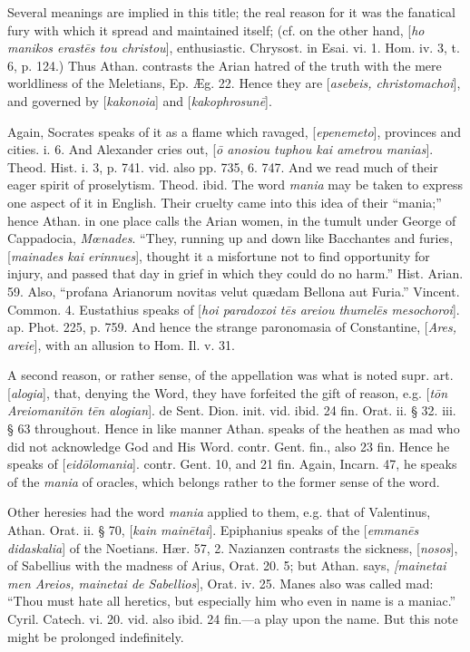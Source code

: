 Several meanings are implied in this title; the
real reason for it was the fanatical fury with which it spread
and maintained itself; (cf. on the other hand, [\emph{ho manikos erast\={e}s
tou christou}], enthusiastic. Chrysost. in Esai. vi. 1. Hom. iv. 3,
t. 6, p. 124.) Thus Athan. contrasts the Arian hatred of the truth
with the mere worldliness of the Meletians, Ep. Æg. 22. Hence they
are [\emph{asebeis, christomachoi}], and governed by [\emph{kakonoia}]
and [\emph{kakophrosun\={e}}].

Again, Socrates speaks of it as a flame which
ravaged, [\emph{epenemeto}], provinces and cities. i. 6. And Alexander
cries out, [\emph{\={o} anosiou tuphou kai ametrou manias}]. Theod.
Hist. i. 3, p. 741. vid. also pp. 735, 6. 747. And we read much of
their eager spirit of proselytism. Theod. ibid. The word \emph{mania}
may be taken to express one aspect of it in English. Their cruelty
came into this idea of their “mania;” hence Athan. in one place
calls the Arian women, in the tumult under George of Cappadocia, \emph{Mœnades}.
“They, running up and down like Bacchantes and furies, [\emph{mainades
kai erinnues}], thought it a misfortune not to find opportunity for
injury, and passed that day in grief in which they could do no
harm.” Hist. Arian. 59. Also, “profana Arianorum novitas velut quædam
Bellona aut Furia.” Vincent. Common. 4. Eustathius speaks of [\emph{hoi
paradoxoi t\={e}s areiou thumel\={e}s mesochoroi}]. ap. Phot.
225, p. 759. And hence the strange paronomasia of Constantine, [\emph{Ares,
areie}], with an allusion to Hom. Il. v. 31.

A second reason, or rather sense, of the
appellation was what is noted supr. art. [\emph{alogia}], that,
denying the Word, they have forfeited the gift of reason, e.g. [\emph{t\={o}n
Areiomanit\={o}n t\={e}n alogian}]. de Sent. Dion.
init. vid. ibid. 24 fin. Orat. ii. § 32. iii. § 63 throughout. Hence
in like manner Athan. speaks of the heathen as mad who did not
acknowledge God and His Word. contr. Gent. fin., also 23 fin. Hence he
speaks of [\emph{eid\={o}lomania}]. contr. Gent. 10, and 21 fin.
Again, Incarn. 47, he speaks of the \emph{mania} of oracles, which
belongs rather to the former sense of the word.

Other heresies had the word \emph{mania} applied
to them, e.g. that of Valentinus, Athan. Orat. ii. § 70, [\emph{kain
main\={e}tai}]. Epiphanius speaks of the [\emph{emman\={e}s
didaskalia}] of the Noetians. Hær. 57, 2. Nazianzen contrasts the
sickness, [\emph{nosos}], of Sabellius with the madness of Arius, Orat.
20. 5; but Athan. says, \emph{[mainetai men Areios, mainetai de Sabellios}],
Orat. iv. 25. Manes also was called mad: “Thou must hate all
heretics, but especially him who even in name is a maniac.” Cyril.
Catech. vi. 20. vid. also ibid. 24 fin.—a play upon the name. But
this note might be prolonged indefinitely.

